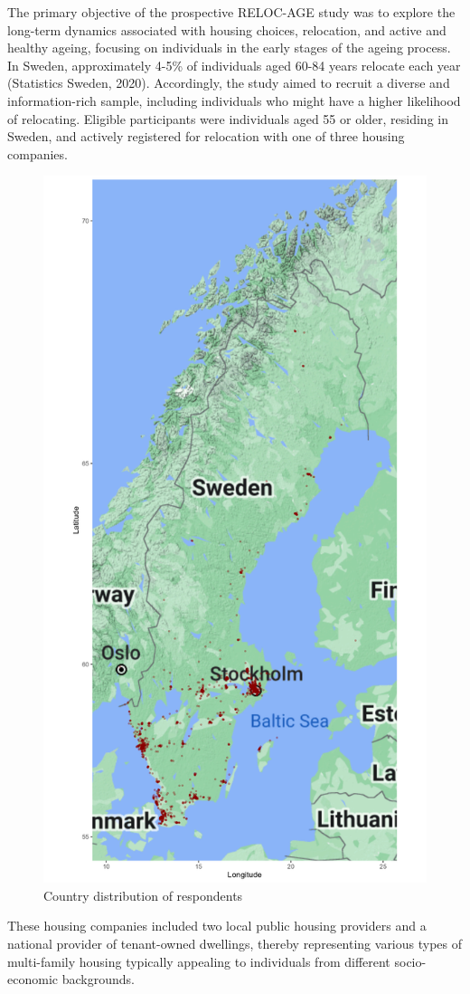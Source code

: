 \documentclass[3p,12pt ]{elsarticle}
\begin{document}
The primary objective of the prospective RELOC-AGE study was to explore the long-term dynamics associated with housing choices, relocation, and active and healthy ageing, focusing on individuals in the early stages of the ageing process.
In Sweden, approximately 4-5\% of individuals aged 60-84 years relocate each year (Statistics Sweden, 2020).
Accordingly, the study aimed to recruit a diverse and information-rich sample, including individuals who might have a higher likelihood of relocating.
Eligible participants were individuals aged 55 or older, residing in Sweden, and actively registered for relocation with one of three housing companies.
\begin{figure}
\centering
\includegraphics[scale=0.25]{figures/survey_location.png}
\caption{Country distribution of respondents \label{fig:map}}
\end{figure}
These housing companies included two local public housing providers and a national provider of tenant-owned dwellings, thereby representing various types of multi-family housing typically appealing to individuals from different socio-economic backgrounds. 
\end{document}
